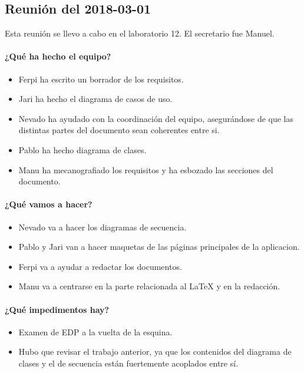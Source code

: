 \documentclass[a4paper, 12pt, spanish]{memoria}
\begin{document}
\subsection*{Reunión del 2018-03-01}
Esta reunión se llevo a cabo en el laboratorio 12. El secretario fue Manuel.

\paragraph{¿Qué ha hecho el equipo?}
\begin{itemize}
    \item Ferpi ha escrito un borrador de los requisitos.
    \item Jari ha hecho el diagrama de casos de uso.
    \item Nevado ha ayudado con la coordinación del equipo, asegurándose de que las distintas partes del documento sean coherentes entre si.
    \item Pablo ha hecho diagrama de clases.
    \item Manu ha mecanografiado los requisitos y ha esbozado las secciones del documento.
\end{itemize}

\paragraph{¿Qué vamos a hacer?}
\begin{itemize}
  \item Nevado va a hacer los diagramas de secuencia.
  \item Pablo y Jari van a hacer maquetas de las páginas principales de la aplicacion.
  \item Ferpi va a ayudar a redactar los documentos.
  \item Manu va a centrarse en la parte relacionada al \LaTeX{} y en la redacción.
\end{itemize}
\paragraph{¿Qué impedimentos hay?}
\begin{itemize}
  \item Examen de EDP a la vuelta de la esquina.
  \item Hubo que revisar el trabajo anterior, ya que los contenidos del diagrama de clases y el de secuencia están fuertemente acoplados entre sí.
\end{itemize}
\end{document}
